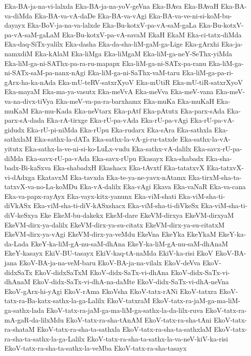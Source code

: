 {Eka-BA-ja-na-vi-lalxda
Eka-BA-ja-na-yoV-geVna
Eka-BAva
Eka-BAvaH
Eka-BA-va-diMda
Eka-BA-va-vA-daDe
Eka-BA-va-vAgi
Eka-BA-va-ve-ni-si-koM-bu-dayayx
Eka-BoV-ja-na-va-lalxde
Eka-Bu-kotxV-pa-vA-saM-gaLa
Eka-Bu-kotxV-pa-vA-saM-gaLaM
Eka-Bu-kotxV-pa-vA-savaM
EkaH
EkaM
Eka-ci-tatx-diMda
Eka-daq-SiTx-yalilx
Eka-dasha
Eka-da-sha-liM-gaM-ga-Lige
Eka-gArxhi
Eka-ja-namxdiM
Eka-kAlaM
Eka-liMga
Eka-liMgaM
Eka-liM-ga-neY-SeThx-yiMda
Eka-liM-ga-ni-SAThx-pa-ra-ru-mapapx
Eka-liM-ga-ni-SATx-pa-ranu
Eka-liM-ga-ni-SATx-saM-pa-nanx-nAgi
Eka-liM-ga-ni-SaThx-vaM-taru
Eka-liM-ga-pa-ri-gArx-ha-ka-nAda
Eka-mU-teRV-satxrXyoV
Eka-mUtiR
Eka-mU-tiR-satxrXyoV
Eka-mayaM
Eka-ma-ya-vasutx
Eka-meVvA
Eka-meVva
Eka-meV-vana
Eka-meV-va-na-divx-tiVya
Eka-meV-va-pa-ra-barxhamx
Eka-muKa
Eka-muKaH
Eka-muKaM
Eka-mu-Kada
Eka-neVtarx
Eka-pAtf
Eka-pAtutx
Eka-parx-sAda
Eka-parx-sA-dada
Eka-rA-tirxge
Eka-rU-pa-vAda
Eka-rU-pa-vAgi
Eka-rU-pa-vA-gidudx
Eka-rU-pi-niMda
Eka-rUpu
Eka-rudarx
Eka-sAra
Eka-sathxla
Eka-sathxlaM
Eka-sathx-la-dATa
Eka-sathx-la-vA-gi-ru-tatxde
Eka-sathx-la-vA-yitutx
Eka-sathx-la-ve-ni-si-ko-LuLx-vudu
Eka-sathx-vA-dalilx
Eka-savx-rU-pa-diMda
Eka-savx-rU-pa-vAda
Eka-savx-rUpu
Ekasayx
Eka-shabadx
Eka-sha-badx-Bi-kaSxva
Eka-shabadxH
Ekashacx
Eka-tAvxtf
Eka-tatatxvX
Eka-tatxvX-vi-dAdxga
EkatavxM
Eka-tavxda
Eka-te-ya-ne-yavx-nAtamx
Eka-tirxM-sha-ta-tatxvX-va-no-La-koMDu
Eka-vA-dalilx
Eka-vAgi
Ekava
Eka-vaNaR
Eka-va-cana
Eka-va-papx-rayAyx
Eka-vayx-kitx-yanunx
Eka-viM-shati
Eka-viM-sha-ti-diVkASx
Eka-viM-sha-ti-diV-kASxshacx
Eka-viM-sha-ti-diVkeSx
Eka-viM-sha-ti-diV-keSxya
Eke
EkeM-bu-dakekx
EkeM-dare
EkeVM-dirxya
EkeVM-dirxyaM
EkeVM-dirx-ya-dalilx
EkeVM-dirx-ya-su-citatx
EkeVM-dirx-ya-su-citatxM
EkeVM-dirx-ya-vAgi
EkeVM-dirx-ya-veMdu
EkeVna
EkeYka
EkeYkaM
EkeY-ka-da-Lada
EkeY-ka-liM-gA-nu-saM-dhAna
EkeY-ka-liM-gA-nu-saM-dhAnaM
EkeY-kasayx
EkiV-BU-tasayx
EkiV-kaq-tA-naMda
EkiV-ka-risi
EkoV
EkoV-BA-jana
EkoV-BA-ja-na-veM-baru
EkoV-BA-ja-na-vilalx
EkoV-deVva
EkoV-didxSaTx
EkoV-didxSaTxM
EkoV-didx-SaTx-vi-dhAna
EkoV-didx-SaTx-vi-dhAnaM
EkoV-didx-SaTx-vi-dhA-na-daMte
EkoV-didx-SaTx-vi-dhA-neVna
EkoV-gArx-hi-yAgi
EkoV-rAma
EkoVsha
EkoV-tatx-rANi
EkoV-tatxra
EkoV-tatx-ra-Ba-katx-sathx-la-ga-Lalilx
EkoV-tatxraM
EkoV-tatx-ra-jaM-ga-ma-liM-ga-sathx-lada
EkoV-tatx-ra-jaM-ga-ma-liM-ga-sathx-la-da-lilx-ruva
EkoV-tatx-ra-mA-gaR-da-lilxMdu
EkoV-tatx-ra-sha-tAnAM
EkoV-tatx-ra-sha-tAni
EkoV-tatx-ra-shataM
EkoV-tatx-ra-sha-ta-sathxla
EkoV-tatx-ra-sha-ta-sathxlaM
EkoV-tatx-ra-sha-ta-sathx-la-ga-Lalilx
EkoV-tatx-ra-sha-ta-sathx-la-va-neV-kiV-ka-risi
EkoV-tatx-ra-sha-ta-sathx-la-veMba
EkoV-tatx-ra-sha-tasayx
}

